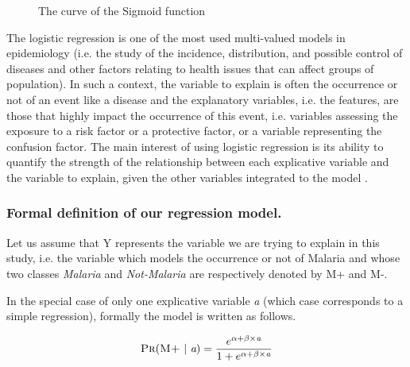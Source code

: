 \begin{figure}[ht]
\centering
{}
\caption{The curve of the Sigmoid function}\label{sigmoid_curve}
\end{figure}

The logistic regression is one of the most used multi-valued models in epidemiology \cite{Am02,Pr05} (i.e. the study of the incidence,
 distribution, and possible control of diseases and other factors relating to health issues that can affect groups of population).
In such a context, the variable to explain is often the occurrence or not of an event like a disease and the explanatory 
variables, i.e. the features, are those that highly impact the occurrence of this event, i.e. variables assessing the exposure to a 
risk factor or a protective factor, or a variable representing the confusion factor.
The main interest of using logistic regression is its ability to quantify the strength of the relationship between each explicative 
variable and the variable to explain, given the other variables integrated to the model \cite{Am02}. 

\subsubsection{Formal definition  of our regression  model.}
Let us assume that \textsc{Y} represents the variable we are trying to explain in this study, i.e. the variable which models the occurrence or not of Malaria and whose 
two classes \emph{Malaria} and \emph{Not-Malaria} are respectively denoted by \textsc{M+} and \textsc{M-}. 

In the special case of only one explicative variable \emph{a} (which case corresponds to a simple regression), formally
the model is written as follows.

\begin{equation}
\textsc{Pr}(\textsc{M+} ~|~ \emph{a}) = \frac{e^{\alpha + \beta\times \emph{a} }}{1 + e^{\alpha + \beta\times \emph{a} }}
\label{simple_regression}
\end{equation}

